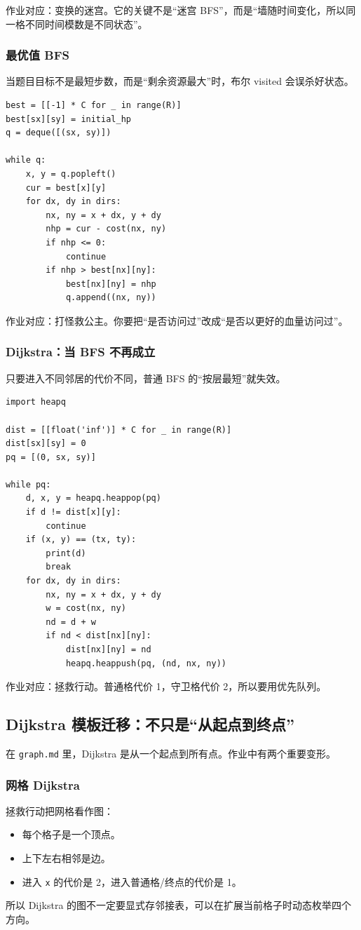 \documentclass[10pt,a4paper,fontset=none]{ctexart}
\begin{document}
作业对应：变换的迷宫。它的关键不是“迷宫 BFS”，而是“墙随时间变化，所以同一格不同时间模数是不同状态”。

\subsubsection{最优值 BFS}
当题目目标不是最短步数，而是“剩余资源最大”时，布尔 visited 会误杀好状态。
\begin{lstlisting}[style=py]
best = [[-1] * C for _ in range(R)]
best[sx][sy] = initial_hp
q = deque([(sx, sy)])

while q:
    x, y = q.popleft()
    cur = best[x][y]
    for dx, dy in dirs:
        nx, ny = x + dx, y + dy
        nhp = cur - cost(nx, ny)
        if nhp <= 0:
            continue
        if nhp > best[nx][ny]:
            best[nx][ny] = nhp
            q.append((nx, ny))
\end{lstlisting}

作业对应：打怪救公主。你要把“是否访问过”改成“是否以更好的血量访问过”。

\subsubsection{Dijkstra：当 BFS 不再成立}
只要进入不同邻居的代价不同，普通 BFS 的“按层最短”就失效。
\begin{lstlisting}[style=py]
import heapq

dist = [[float('inf')] * C for _ in range(R)]
dist[sx][sy] = 0
pq = [(0, sx, sy)]

while pq:
    d, x, y = heapq.heappop(pq)
    if d != dist[x][y]:
        continue
    if (x, y) == (tx, ty):
        print(d)
        break
    for dx, dy in dirs:
        nx, ny = x + dx, y + dy
        w = cost(nx, ny)
        nd = d + w
        if nd < dist[nx][ny]:
            dist[nx][ny] = nd
            heapq.heappush(pq, (nd, nx, ny))
\end{lstlisting}

作业对应：拯救行动。普通格代价 1，守卫格代价 2，所以要用优先队列。

\subsection{Dijkstra 模板迁移：不只是“从起点到终点”}
在 \texttt{graph.md} 里，Dijkstra 是从一个起点到所有点。作业中有两个重要变形。

\subsubsection{网格 Dijkstra}
拯救行动把网格看作图：
\begin{itemize}
  \item 每个格子是一个顶点。
  \item 上下左右相邻是边。
  \item 进入 \texttt{x} 的代价是 2，进入普通格/终点的代价是 1。
\end{itemize}
所以 Dijkstra 的图不一定要显式存邻接表，可以在扩展当前格子时动态枚举四个方向。
\end{document}
